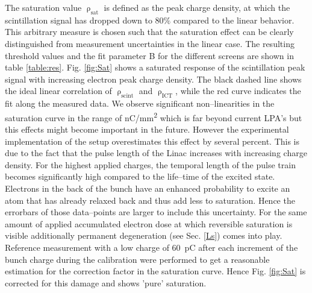 \documentclass[%
preprint,
amsmath,
amssymb,
aip,
rsi, 
numerical,
floatfix,
]{revtex4-1}
\begin{document}
The saturation value $\uprho_{\text{sat}}$ is defined as the peak charge density, at which the scintillation signal has dropped down to 80$\%$ compared to the linear behavior.
This arbitrary measure is chosen such that the saturation effect can be clearly distinguished from measurement uncertainties in the linear case. 
The resulting threshold values and the fit parameter B for the different screens are shown in table \ref{table:res}.
Fig. \ref{fig:Sat} shows a saturated response of the scintillation peak signal with increasing electron peak charge density. 
The black dashed line shows the ideal linear correlation of $\uprho_{\text{scint}}$ and $\uprho_{\text{ICT}}$, while the red curve indicates the fit along the measured data. 
We observe significant non--linearities in the saturation curve in the range of \si[per-mode=symbol]{\nano\coulomb \per \square\milli\meter} which is far beyond current LPA's but this effects might become important in the future. 
However the experimental implementation of the setup overestimates this effect by several percent. 
This is due to the fact that the pulse length of the Linac increases with increasing charge density.
For the highest applied charges, the temporal length of the pulse train becomes significantly high compared to the life--time of the excited state.
Electrons in the back of the bunch have an enhanced probability to excite an atom that has already relaxed back and thus add less to saturation.
Hence the errorbars of those data--points are larger to include this uncertainty.
For the same amount of applied accumulated electron dose at which reversible saturation is visible additionally permanent degeneration (see Sec. \ref{Ls}) comes into play.
Reference measurement with a low charge of \SI{60}{\pico\coulomb} after each increment of the bunch charge during the calibration were performed to get a reasonable estimation for the correction factor in the saturation curve.
Hence Fig. \ref{fig:Sat} is corrected for this damage and shows 'pure' saturation.      
\end{document}
